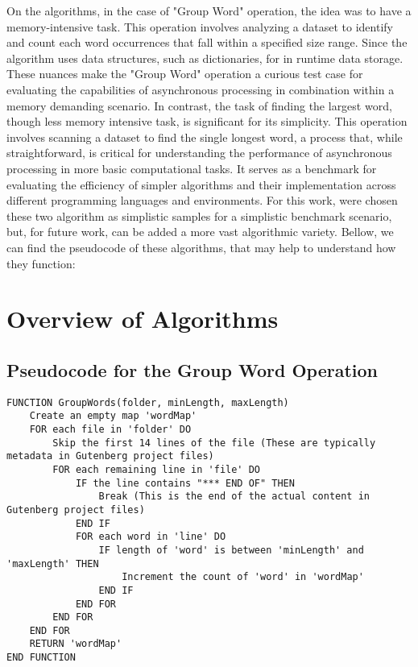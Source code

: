 On the algorithms, in the case of "Group Word" operation, the idea was to have a memory-intensive task. This operation involves analyzing a dataset to identify and count each word occurrences that fall within a specified size range. Since the algorithm uses data structures, such as dictionaries, for in runtime data storage. These nuances make the "Group Word" operation a curious test case for evaluating the capabilities of asynchronous processing in combination within a memory demanding scenario.
In contrast, the task of finding the largest word, though less memory intensive task, is significant for its simplicity. This operation involves scanning a dataset to find the single longest word, a process that, while straightforward, is critical for understanding the performance of asynchronous processing in more basic computational tasks. It serves as a benchmark for evaluating the efficiency of simpler algorithms and their implementation across different programming languages and environments.
For this work, were chosen these two algorithm as simplistic samples for a simplistic benchmark scenario, but, for future work, can be added a more vast algorithmic variety.
Bellow, we can find the pseudocode of these algorithms, that may help to understand how they function:


\section{Overview of Algorithms}
\label{sec:algorithm_overview}

\subsection*{Pseudocode for the Group Word Operation}
\begin{lstlisting}[language={}, caption={Pseudocode for GroupWords function}, label={lst:groupwords}]
FUNCTION GroupWords(folder, minLength, maxLength)
    Create an empty map 'wordMap'
    FOR each file in 'folder' DO
        Skip the first 14 lines of the file (These are typically metadata in Gutenberg project files)
        FOR each remaining line in 'file' DO
            IF the line contains "*** END OF" THEN
                Break (This is the end of the actual content in Gutenberg project files)
            END IF
            FOR each word in 'line' DO
                IF length of 'word' is between 'minLength' and 'maxLength' THEN
                    Increment the count of 'word' in 'wordMap'
                END IF
            END FOR
        END FOR
    END FOR
    RETURN 'wordMap'
END FUNCTION
\end{lstlisting}

